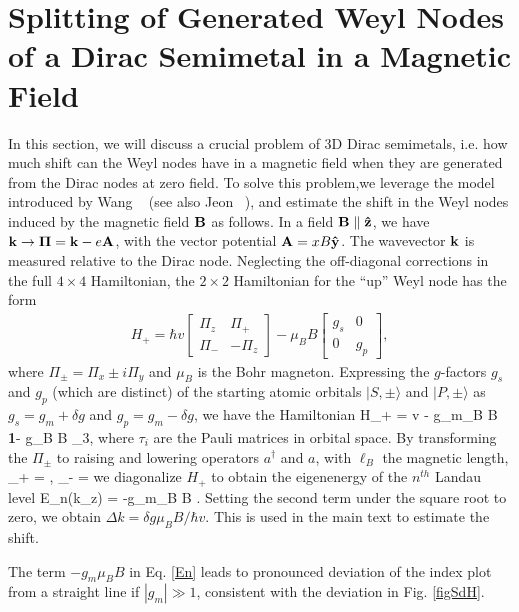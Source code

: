 \chapter{Splitting of Generated Weyl Nodes of a Dirac Semimetal in a Magnetic Field\label{ch:WeylSplit}}


In this section, we will discuss a crucial problem of 3D Dirac semimetals, i.e. how much shift can the Weyl nodes have in a magnetic field when they are generated from the Dirac nodes at zero field. To solve this problem,we leverage the model introduced by Wang \etal~\cite{Wang2012} (see also Jeon \etal~\cite{Jeon2014}), and estimate the shift in the Weyl nodes induced by the magnetic field $\bf B$ as follows. In a field $\bf B\parallel \hat{z}$, we have ${\bf k \to \Pi} = {\bf k} - e{\bf A}$, with the vector potential ${\bf A} = xB{\bf \hat{y}}$. The wavevector $\bf k$ is measured relative to the Dirac node. Neglecting the off-diagonal corrections in the full $4\times4$ Hamiltonian, the
$2\times2$ Hamiltonian for the ``up'' Weyl node has the form 
\begin{eqnarray}
H_+ = \hbar v\left[\begin{array}{cc}
						\Pi_z   &  \Pi_+   \\
						\Pi_-   &   -\Pi_z  
						\end{array}\right]
						-\mu_B B \left[\begin{array}{cc}
						g_s   &   0   \\
						0      &   g_p  
						\end{array}\right],
						\label{H1}
						\end{eqnarray}
where $\Pi_{\pm} = \Pi_x \pm i\Pi_y$ and $\mu_B$ is the Bohr magneton. Expressing the $g$-factors $g_s$ and $g_p$ (which are distinct) of the starting atomic orbitals $|S,\pm\rangle$ and $|P,\pm\rangle$ as $g_s = g_m + \delta g$ and $g_p = g_m - \delta g$, we have the Hamiltonian 
\be
H_+ = v{\bf \Pi\cdot }\boldsymbol{\tau} - g_m\mu_B B {\bf 1}- \delta g\mu_B B \tau_3,
\label{H2}
\ee
where $\tau_i$ are the Pauli matrices in orbital space.
By transforming the $\Pi_\pm$ to raising and lowering operators $a^\dagger$ and $a$, with $\ell_B$ the magnetic length,
\be
\Pi_+ = , \quad \Pi_- = 
\label{Pi}
\ee
we diagonalize $H_+$ to obtain the eigenenergy of the $n^{th}$ Landau level
\be
E_n(k_z) = -g_m\mu_B B \pm {}.
\label{En}
\ee
Setting the second term under the square root to zero, we obtain $\Delta k = \delta g\mu_B B/\hbar v$.
This is used in the main text to estimate the shift. 

The term $-g_m\mu_B B$ in Eq. \ref{En} leads to pronounced deviation of the index plot from a straight line if $|g_m|\gg 1$, consistent with the deviation in Fig. \ref{figSdH}.

